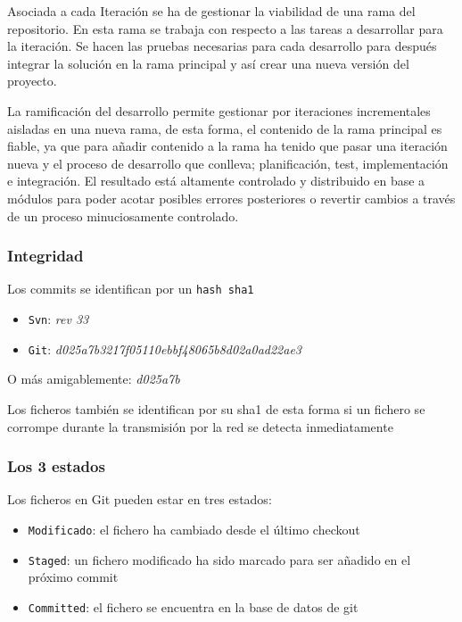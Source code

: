 \par Asociada a cada Iteración se ha de gestionar la viabilidad de una rama del repositorio. En esta rama se trabaja con respecto a las tareas a desarrollar para la iteración. Se hacen las pruebas necesarias para cada desarrollo para después integrar la solución en la rama principal y así crear una nueva versión del proyecto. 

\par La ramificación del desarrollo permite gestionar por iteraciones incrementales aisladas en una nueva rama, de esta forma, el contenido de la rama principal es fiable, ya que para añadir contenido a la rama ha tenido que pasar una iteración nueva y el proceso de desarrollo que conlleva; planificación, test, implementación e integración. El resultado está altamente controlado y distribuido en base a módulos para poder acotar posibles errores posteriores o revertir cambios a través de un proceso minuciosamente controlado.

\subsubsection{Integridad}
\label{subs:git-integridad}

\par Los commits se identifican por un \texttt{hash sha1}

\begin{itemize}
    \item \texttt{Svn}: \emph{rev 33}
    \item \texttt{Git}: \emph{d025a7b3217f05110ebbf48065b8d02a0ad22ae3}
\end{itemize}

\par O más amigablemente: \emph{d025a7b}

\par Los ficheros también se identifican por su sha1 de esta forma si un fichero se corrompe durante la transmisión por la red se detecta inmediatamente

\subsubsection{Los 3 estados}
\label{subs:git-3-estados}

\par Los ficheros en Git pueden estar en tres estados:

\begin{itemize}
    \item \texttt{Modificado}: el fichero ha cambiado desde el último checkout
    \item \texttt{Staged}: un fichero modificado ha sido marcado para ser añadido en el próximo commit
    \item \texttt{Committed}: el fichero se encuentra en la base de datos de git
\end{itemize}

